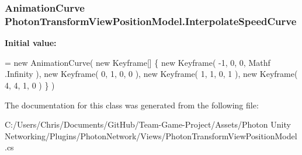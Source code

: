 \subsubsection[{\texorpdfstring{Interpolate\+Speed\+Curve}{InterpolateSpeedCurve}}]{\setlength{\rightskip}{0pt plus 5cm}Animation\+Curve Photon\+Transform\+View\+Position\+Model.\+Interpolate\+Speed\+Curve}\hypertarget{class_photon_transform_view_position_model_a3cd4b81cdcb3b099e1514ca7aba02d46}{}\label{class_photon_transform_view_position_model_a3cd4b81cdcb3b099e1514ca7aba02d46}
{\bfseries Initial value\+:}
\begin{DoxyCode}
= \textcolor{keyword}{new} AnimationCurve( \textcolor{keyword}{new} Keyframe[] \{ 
                                                                              \textcolor{keyword}{new} Keyframe( -1, 0, 0, Mathf
      .Infinity ), 
                                                                              \textcolor{keyword}{new} Keyframe( 0, 1, 0, 0 ), 
                                                                              \textcolor{keyword}{new} Keyframe( 1, 1, 0, 1 ), 
                                                                              \textcolor{keyword}{new} Keyframe( 4, 4, 1, 0 ) \} 
      )
\end{DoxyCode}


The documentation for this class was generated from the following file\+:\begin{DoxyCompactItemize}
\item 
C\+:/\+Users/\+Chris/\+Documents/\+Git\+Hub/\+Team-\/\+Game-\/\+Project/\+Assets/\+Photon Unity Networking/\+Plugins/\+Photon\+Network/\+Views/Photon\+Transform\+View\+Position\+Model.\+cs\end{DoxyCompactItemize}
